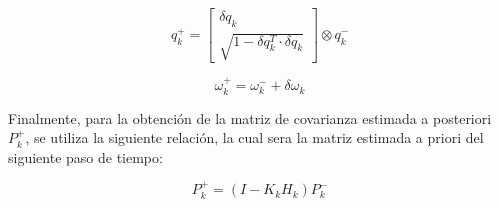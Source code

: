 \begin{equation}
	q_k^+ = \begin{bmatrix}
		\delta q_k \\
		\sqrt{1 - \delta q_k^T \cdot \delta q_k}
	\end{bmatrix} \otimes q_k^-
	\label{eq:quat_ekf}
\end{equation}

\begin{equation}
	\omega_k^+ = \omega_k^- + \delta \omega_k
	\label{eq:omega_ekf}
\end{equation}

Finalmente, para la obtención de la matriz de covarianza estimada a posteriori $P_{k}^{+}$, se utiliza la siguiente relación, la cual sera la matriz estimada a priori del siguiente paso de tiempo:

\[
P_k^+ = (I - K_k H_k) P_k^-
\]
